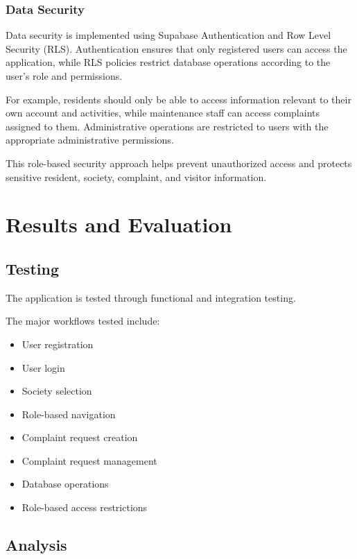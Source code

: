 \documentclass{tietreport}
\begin{document}
\subsection{Data Security}

Data security is implemented using Supabase
Authentication and Row Level Security (RLS). Authentication
ensures that only registered users can access the
application, while RLS policies restrict database
operations according to the user's role and permissions.

For example, residents should only be able to access
information relevant to their own account and activities,
while maintenance staff can access complaints assigned to
them. Administrative operations are restricted to users
with the appropriate administrative permissions.

This role-based security approach helps prevent
unauthorized access and protects sensitive resident,
society, complaint, and visitor information.

\chapter{Results and Evaluation}

\section{Testing}

The application is tested through functional and
integration testing.

The major workflows tested include:

\begin{itemize}
    \item User registration
    \item User login
    \item Society selection
    \item Role-based navigation
    \item Complaint request creation
    \item Complaint request management
    \item Database operations
    \item Role-based access restrictions
\end{itemize}

\section{Analysis}
\end{document}
